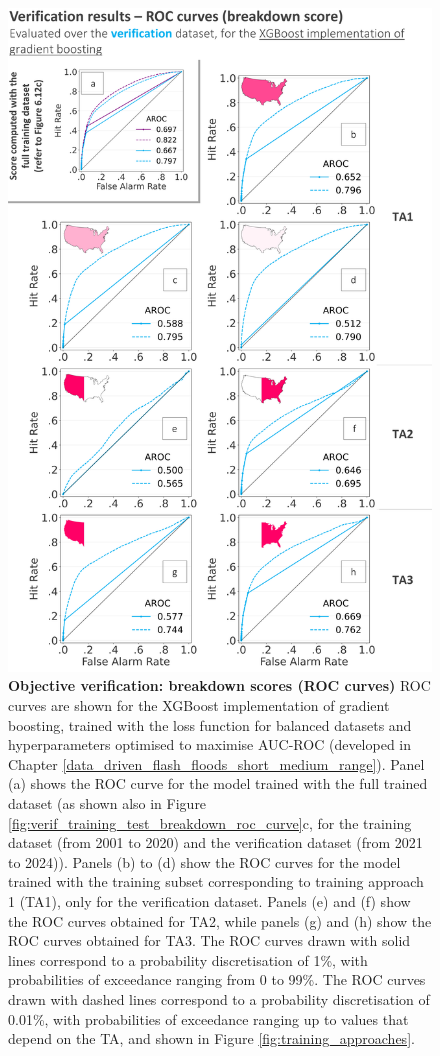 \begin{figure}[htbp]
\centering
\includegraphics[scale = 0.95]{verif_breakdown_scores_roc_curve.png}
\caption{\textbf{Objective verification: breakdown scores (ROC curves)} ROC curves are shown for the XGBoost implementation of gradient boosting, trained with the loss function for balanced datasets and hyperparameters optimised to maximise AUC-ROC (developed in Chapter \ref{data_driven_flash_floods_short_medium_range}). Panel (a) shows the ROC curve for the model trained with the full trained dataset (as shown also in Figure \ref{fig:verif_training_test_breakdown_roc_curve}c, for the \textcolor{colourTraining}{training} dataset (from 2001 to 2020) and the \textcolor{colourTest}{verification} dataset (from 2021 to 2024)). Panels (b) to (d) show the ROC curves for the model trained with the training subset corresponding to training approach 1 (TA1), only for the \textcolor{colourTest}{verification} dataset. Panels (e) and (f) show the ROC curves obtained for TA2, while panels (g) and (h) show the ROC curves obtained for TA3. The ROC curves drawn with solid lines correspond to a probability discretisation of 1\%, with probabilities of exceedance ranging from 0 to 99\%. The ROC curves drawn with dashed lines correspond to a probability discretisation of 0.01\%, with probabilities of exceedance ranging up to values that depend on the TA, and shown in Figure \ref{fig:training_approaches}.}

\end{figure}
